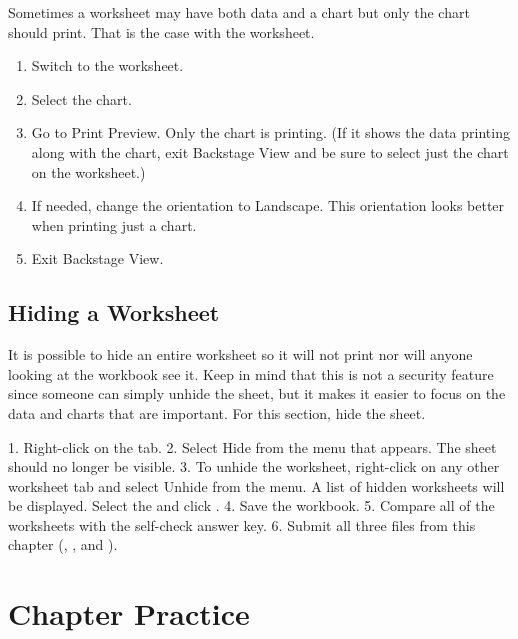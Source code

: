 Sometimes a worksheet may have both data and a chart but only the chart should print. That is the case with the  worksheet.

\begin{enumerate}
	\item Switch to the  worksheet.
	\item Select the chart.
	\item Go to Print Preview. Only the chart is printing. (If it shows the data printing along with the chart, exit Backstage View and be sure to select just the chart on the worksheet.)
	\item If needed, change the orientation to Landscape. This orientation looks better when printing just a chart.
	\item Exit Backstage View.
\end{enumerate}

\subsection{Hiding a Worksheet}

It is possible to hide an entire worksheet so it will not print nor will anyone looking at the workbook see it. Keep in mind that this is not a security feature since someone can simply unhide the sheet, but it makes it easier to focus on the data and charts that are important. For this section, hide the  sheet.

1. Right-click on the  tab.
2. Select Hide from the menu that appears. The  sheet should no longer be visible.
3. To unhide the worksheet, right-click on any other worksheet tab and select Unhide from the menu. A list of hidden worksheets will be displayed. Select the  and click .
4. Save the  workbook.
5. Compare all of the worksheets with the self-check answer key.
6. Submit all three files from this chapter (, , and ).

\section{Chapter Practice}

